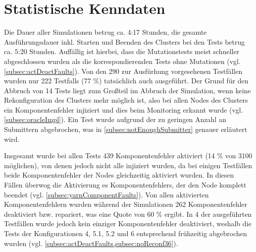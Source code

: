 \section{Statistische Kenndaten}
\label{sec:evaluationStats}

Die Dauer aller Simulationen betrug ca. 4:17 Stunden, die gesamte Ausführungsdauer inkl. Starten und Beenden des Clusters bei den Tests betrug ca. 5:20 Stunden.
Auffällig ist hierbei, dass die Mutationstests meist schneller abgeschlossen wurden als die korrespondierenden Tests ohne Mutationen (vgl. \cref{subsec:actDeactFaults}).
Von den 290 zur Ausfürhung vorgesehenen Testfällen wurden nur 222 \glspl{Testfall} (77 \%) tatsächlich auch ausgeführt.
Der Grund für den Abbruch von 14 \glspl{Test} liegt zum Großteil im Abbruch der Simulation, wenn keine Rekonfiguration des Clusters mehr möglich ist, also bei allen Nodes des Clusters ein Komponentenfehler injiziert und dies beim Monitoring erkannt wurde (vgl. \cref{subsec:oracleImpl}).
Ein \gls{Test} wurde aufgrund der zu geringen Anzahl an Submittern abgebrochen, was in \cref{subsec:notEnoughSubmitter} genauer erläutert wird.

Insgesamt wurde bei allen \glspl{Test} 439 Komponentenfehler aktiviert (14 \% von 3100 möglichen), von denen jedoch nicht alle injiziert wurden, da bei einigen Testfällen beide Komponentenfehler der Nodes gleichzeitig aktiviert wurden.
In diesen Fällen überwog die Aktivierung es Komponentenfehlers, der den Node komplett beendet (vgl.  \cref{subsec:yarnComponentFaults}).
Von allen aktivierten Komponentenfehlern wurden während der Simulationen 262 Komponentenfehler deaktiviert bzw. repariert, was eine Quote von 60 \% ergibt.
In 4 der ausgeführten Testfällen wurde jedoch kein einziger Komponentenfehler deaktiviert, weshalb die \glspl{Test} der Konfigurationen 4, 5.1, 5.2 und 6 entsprechend frühzeitig abgebrochen wurden (vgl. \cref{subsec:actDeactFaults,subsec:noReconf36}).

